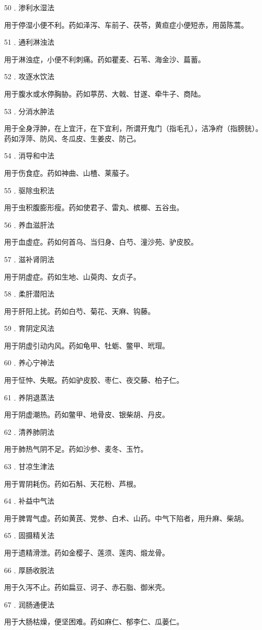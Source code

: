 \documentclass[12pt,UTF8]{ctexbook}
\begin{document}
50﹒渗利水湿法

用于停湿小便不利。药如泽泻、车前子、茯苓，黄疸症小便短赤，用茵陈蒿。

51﹒通利淋浊法

用于淋浊症，小便不利刺痛。药如瞿麦、石苇、海金沙、萹蓄。

52﹒攻逐水饮法

用于腹水或水停胸胁。药如葶苈、大戟、甘遂、牵牛子、商陆。

53﹒分消水肿法

用于全身浮肿，在上宜汗，在下宜利，所谓开鬼门（指毛孔），洁净府（指膀胱）。药如浮萍、防风、冬瓜皮、生姜皮、防己。

54﹒消导和中法

用于伤食症。药如神曲、山楂、莱菔子。

55﹒驱除虫积法

用于虫积腹膨形瘦。药如使君子、雷丸、槟榔、五谷虫。

56﹒养血滋肝法

用于血虚症。药如何首乌、当归身、白芍、潼沙苑、驴皮胶。

57﹒滋补肾阴法

用于阴虚症。药如生地、山萸肉、女贞子。

58﹒柔肝潜阳法

用于肝阳上扰。药如白芍、菊花、天麻、钩藤。

59﹒育阴定风法

用于阴虚引动内风。药如龟甲、牡蛎、鳖甲、玳瑁。

60﹒养心宁神法

用于怔忡、失眠。药如驴皮胶、枣仁、夜交藤、柏子仁。

61﹒养阴退蒸法

用于阴虚潮热。药如鳖甲、地骨皮、银柴胡、丹皮。

62﹒清养肺阴法

用于肺热气阴不足。药如沙参、麦冬、玉竹。

63﹒甘凉生津法

用于胃阴耗伤。药如石斛、天花粉、芦根。

64﹒补益中气法

用于脾胃气虚。药如黄芪、党参、白术、山药。中气下陷者，用升麻、柴胡。

65﹒固摄精关法

用于遗精滑泄。药如金樱子、莲须、莲肉、煅龙骨。

66﹒厚肠收脱法

用于久泻不止。药如扁豆、诃子、赤石脂、御米壳。

67﹒润肠通便法

用于大肠枯燥，便坚困难。药如麻仁、郁李仁、瓜蒌仁。
\end{document}
